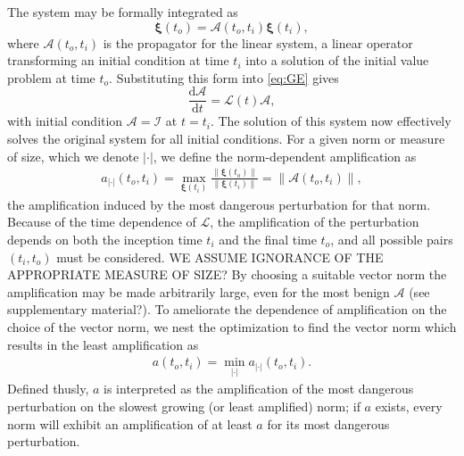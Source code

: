 \documentclass[letterpaper,prl,aps,twocolumn,reprint,superscriptaddress]{revtex4-1}
\newcommand{\cL}{\boldsymbol{\mathcal{L}}}
\newcommand{\cA}{\boldsymbol{\mathcal{A}}}
\newcommand{\cI}{\boldsymbol{\mathcal{I}}}
\newcommand{\prt}{\boldsymbol{\xi}}
\newcommand{\nrm}{{|\cdot|}}
\newcommand{\norm}[1]{{\|#1\|}}
\newcommand{\obs}{o}
\newcommand{\inc}{i}
\begin{document}
The system may be formally integrated as
\begin{equation} \label{eq:PROP}
\prt (t_\obs) = \cA(t_\obs, t_\inc) \prt (t_\inc), 
\end{equation}
where $\cA (t_\obs, t_\inc)$ is the propagator for the linear system, a linear operator transforming an initial condition at time $t_\inc$ into a solution of the initial value problem at time $t_\obs$.  Substituting this form into \eqref{eq:GE} gives
\begin{equation} \label{eq:ME}
\frac{\text{d}\cA}{\text{d} t} = \cL(t)\cA,
\end{equation}
with initial condition $\cA=\cI$ at $t=t_\inc$.  The solution of this system now effectively solves the original system for all initial conditions.  For a given norm or measure of size, which we denote $\nrm$, we define the norm-dependent amplification as 
\begin{align}
a_\nrm(t_\obs, t_\inc) = \max_{\prt(t_\inc)} \frac{\norm{\prt(t_\obs)}}{\norm{\prt(t_\inc)}} = \norm{\cA(t_\obs,t_\inc)}, \label{eqn:amp1} %
\end{align}
the amplification 
induced by the most dangerous perturbation for that norm. 
Because of the time dependence of $\cL$, the amplification of the perturbation depends on both the inception time $t_\inc$ and the final time $t_\obs$, and all possible pairs $(t_\inc, t_\obs)$ must be considered. 
WE ASSUME IGNORANCE OF THE APPROPRIATE MEASURE OF SIZE?  By choosing a suitable vector norm the amplification may be made arbitrarily large, even for the most benign $\cA$ (see supplementary material?). 
To ameliorate the dependence of amplification on the choice of the vector norm, we nest the optimization to find the vector norm which results in the least amplification as
\begin{align}
a(t_\obs, t_\inc) = \min_{|\cdot|} a_\nrm (t_\obs, t_\inc). \label{eqn:amp2} %
\end{align}
Defined thusly, $a$ is interpreted as the amplification of the most dangerous perturbation on the slowest growing (or least amplified) norm; 
if $a$ exists, every norm will exhibit an amplification of at least $a$ for its most dangerous perturbation.
\end{document}
